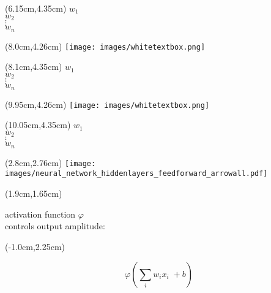 \documentclass{beamer}
\begin{document}
{\begin{textblock*}{2.7cm}(6.15cm,4.35cm) %
$w_1$\\  
$w_2$\\ 
$\vdots$\\ 
$w_n$
\end{textblock*}


%
%
\begin{textblock*}{0.65cm}(8.0cm,4.26cm) %
\texttt{[image: images/whitetextbox.png]}
\end{textblock*}

\begin{textblock*}{2.7cm}(8.1cm,4.35cm) %
$w_1$\\  
$w_2$\\ 
$\vdots$\\ 
$w_n$
\end{textblock*}

%
%
\begin{textblock*}{0.65cm}(9.95cm,4.26cm) %
\texttt{[image: images/whitetextbox.png]}
\end{textblock*}

\begin{textblock*}{2.7cm}(10.05cm,4.35cm) %
$w_1$\\  
$w_2$\\ 
$\vdots$\\ 
$w_n$
\end{textblock*}



\begin{textblock*}{7.5cm}(2.8cm,2.76cm) %
\texttt{[image: images/neural\_network\_hiddenlayers\_feedforward\_arrowall.pdf]}
\end{textblock*}

\begin{textblock*}{7.7cm}(1.9cm,1.65cm) %
\begin{footnotesize}
activation function $\varphi$ \\ \vspace{-0.15cm} controls output amplitude:
\end{footnotesize}
\end{textblock*}


\begin{textblock*}{7.7cm}(-1.0cm,2.25cm) %
\begin{footnotesize}
\begin{equation*}
\varphi(\sum_i w_i x_i  \; + b)
\end{equation*}
\end{footnotesize}
\end{textblock*}


}
\end{document}
